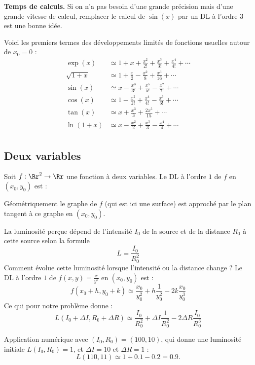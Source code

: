 \documentclass[11pt,class=report,crop=false]{standalone}
\begin{document}
\begin{exemple}
\textbf{Temps de calculs.}
Si on n'a pas besoin d'une grande précision mais d'une grande vitesse de calcul, 
remplacer le calcul de $\sin(x)$ par un DL à l'ordre $3$ est une bonne idée.

\end{exemple}


Voici les premiers termes des développements limités de fonctions usuelles autour de $x_0 = 0$ :
\begin{align*}
\exp(x) &\simeq 1+x+\frac{x^2}{2!}+\frac{x^3}{3!} + \frac{x^4}{4!} + \cdots \\
\sqrt{1+x} &\simeq 1+\frac{x}{2}-\frac{x^2}{8}+\frac{x^3}{16} + \cdots \\
\sin(x) &\simeq x - \frac{x^3}{3!} + \frac{x^5}{5!} - \frac{x^7}{7!} + \cdots \\
\cos(x) &\simeq 1 - \frac{x^2}{2!} + \frac{x^4}{4!} - \frac{x^6}{6!} + \cdots \\
\tan(x) &\simeq x + \frac{x^3}{3} + \frac{2x^5}{15} + \cdots \\
\ln(1+x) &\simeq x - \frac{x^2}{2} + \frac{x^3}{3} - \frac{x^4}{4} + \cdots \\
\end{align*}


\subsection{Deux variables}

Soit $f : \Rr^2 \to \Rr$ une fonction à deux variables. Le DL à l'ordre $1$ de $f$ en $(x_0,y_0)$ est : 

Géométriquement le graphe de $f$ (qui est ici une surface) est approché par le plan tangent à ce graphe en $(x_0,y_0)$.


\begin{exemple}
La luminosité perçue dépend de l'intensité $I_0$ de la source et de la distance $R_0$ à cette source selon la formule
$$L = \frac{I_0}{R_0^2}$$
Comment évolue cette luminosité lorsque l'intensité ou la distance change ?
Le DL à l'ordre $1$ de $f(x,y) = \frac{x}{y^2}$ en $(x_0,y_0)$ est :
$$f(x_0+h,y_0+k) \simeq  \frac{x_0}{y_0^2} + h\frac{1}{y_0^2} - 2k\frac{x_0}{y_0^3}$$
Ce qui pour notre problème donne :
$$L(I_0 + \Delta I, R_0 + \Delta R) \simeq  \frac{I_0}{R_0^2} + \Delta I\frac{1}{R_0^2} - 2\Delta R\frac{I_0}{R_0^3}$$

Application numérique avec $(I_0,R_0) = (100,10)$, qui donne une luminosité initiale $L(I_0,R_0)=1$, et $\Delta I = 10$ et $\Delta R = 1$ :
$$L(110,11) \simeq 1 + 0.1 - 0.2 = 0.9.$$  
\end{exemple}
\end{document}
